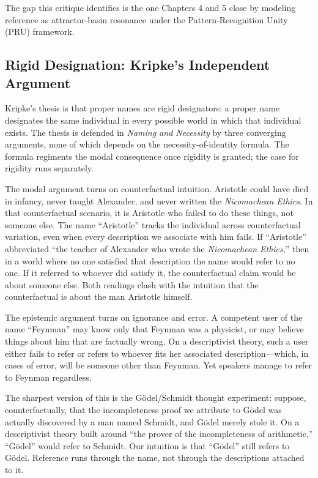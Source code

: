 \documentclass[10pt]{article}
\newcounter{none}%
\begin{document}
The gap this critique identifies is the one Chapters 4 and 5 close by modeling reference as attractor-basin resonance under the Pattern-Recognition Unity (PRU) framework.

\subsection{Rigid Designation: Kripke's Independent Argument}\label{rigid-designation-kripkes-independent-argument}

Kripke's thesis is that proper names are rigid designators: a proper name designates the same individual in every possible world in which that individual exists. The thesis is defended in \emph{Naming and Necessity} by three converging arguments, none of which depends on the necessity-of-identity formula. The formula regiments the modal consequence once rigidity is granted; the case for rigidity runs separately.

The modal argument turns on counterfactual intuition. Aristotle could have died in infancy, never taught Alexander, and never written the \emph{Nicomachean Ethics}. In that counterfactual scenario, it is Aristotle who failed to do these things, not someone else. The name ``Aristotle'' tracks the individual across counterfactual variation, even when every description we associate with him fails. If ``Aristotle'' abbreviated ``the teacher of Alexander who wrote the \emph{Nicomachean Ethics},'' then in a world where no one satisfied that description the name would refer to no one. If it referred to whoever did satisfy it, the counterfactual claim would be about someone else. Both readings clash with the intuition that the counterfactual is about the man Aristotle himself.

The epistemic argument turns on ignorance and error. A competent user of the name ``Feynman'' may know only that Feynman was a physicist, or may believe things about him that are factually wrong. On a descriptivist theory, such a user either fails to refer or refers to whoever fits her associated description---which, in cases of error, will be someone other than Feynman. Yet speakers manage to refer to Feynman regardless.

The sharpest version of this is the Gödel/Schmidt thought experiment: suppose, counterfactually, that the incompleteness proof we attribute to Gödel was actually discovered by a man named Schmidt, and Gödel merely stole it. On a descriptivist theory built around ``the prover of the incompleteness of arithmetic,'' ``Gödel'' would refer to Schmidt. Our intuition is that ``Gödel'' still refers to Gödel. Reference runs through the name, not through the descriptions attached to it.
\end{document}
